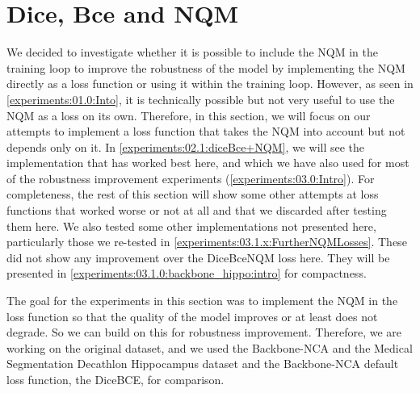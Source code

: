 \section{Dice, Bce and NQM}
\label{experiments:02.0:intro}
We decided to investigate whether it is possible to include the NQM in the training loop to improve the robustness of the model by implementing the NQM directly as a loss function or using it within the training loop. However, as seen in \autoref{experiments:01.0:Into}, it is technically possible but not very useful to use the NQM as a loss on its own. Therefore, in this section, we will focus on our attempts to implement a loss function that takes the NQM into account but not depends only on it. In \autoref{experiments:02.1:diceBce+NQM}, we will see the implementation that has worked best here, and which we have also used for most of the robustness improvement experiments (\autoref{experiments:03.0:Intro}). For completeness, the rest of this section will show some other attempts at loss functions that worked worse or not at all and that we discarded after testing them here. We also tested some other implementations not presented here, particularly those we re-tested in \autoref{experiments:03.1.x:FurtherNQMLosses}. These did not show any improvement over the DiceBceNQM loss here. They will be presented in \autoref{experiments:03.1.0:backbone_hippo:intro} for compactness.


The goal for the experiments in this section was to implement the NQM in the loss function so that the quality of the model improves or at least does not degrade. So we can build on this for robustness improvement. Therefore, we are working on the original dataset, and we used the Backbone-NCA and the Medical Segmentation Decathlon Hippocampus dataset \cite{Antonelli:2022:MedSegmentationDecatlon} and the Backbone-NCA default loss function, the DiceBCE, for comparison.


